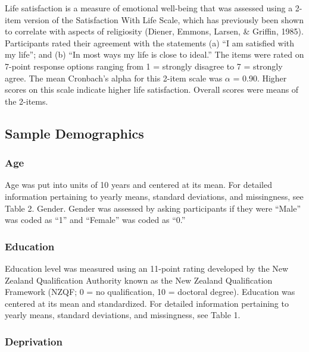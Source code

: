 \documentclass[
  english,
  man,floatsintext]{apa6}
\begin{document}
Life satisfaction is a measure of emotional well-being that was assessed using a 2-item version of the Satisfaction With Life Scale, which has previously been shown to correlate with aspects of religiosity (Diener, Emmons, Larsen, \& Griffin, 1985). Participants rated their agreement with the statements (a) ``I am satisfied with my life''; and (b) ``In most ways my life is close to ideal.'' The items were rated on 7-point response options ranging from 1 = strongly disagree to 7 = strongly agree. The mean Cronbach's alpha for this 2-item scale was \(\alpha\) = 0.90. Higher scores on this scale indicate higher life satisfaction. Overall scores were means of the 2-items.

\hypertarget{sample-demographics}{%
\subsection{Sample Demographics}\label{sample-demographics}}

\hypertarget{age}{%
\subsubsection{Age}\label{age}}

Age was put into units of 10 years and centered at its mean. For detailed information pertaining to yearly means, standard deviations, and missingness, see Table 2. Gender. Gender was assessed by asking participants if they were ``Male'' was coded as ``1'' and ``Female'' was coded as ``0.''

\hypertarget{education}{%
\subsubsection{Education}\label{education}}

Education level was measured using an 11-point rating developed by the New Zealand Qualification Authority known as the New Zealand Qualification Framework (NZQF; 0 = no qualification, 10 = doctoral degree). Education was centered at its mean and standardized. For detailed information pertaining to yearly means, standard deviations, and missingness, see Table 1.

\hypertarget{deprivation}{%
\subsubsection{Deprivation}\label{deprivation}}
\end{document}
